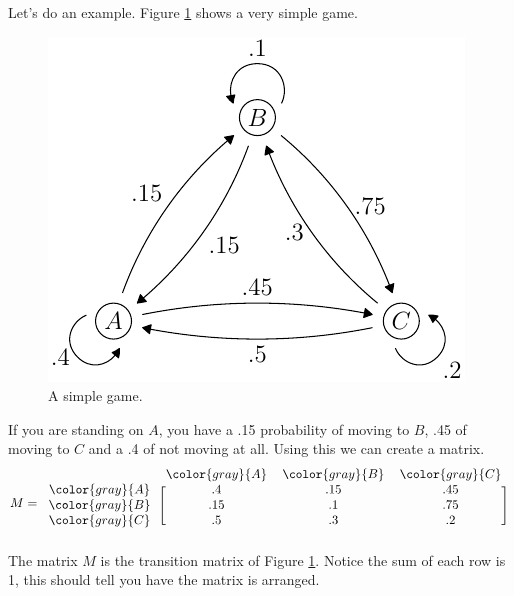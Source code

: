 \documentclass[11pt,letterpaper]{article}
\begin{document}
Let's do an example. Figure \ref{fig:simple_game} shows a very simple game. 
\begin{figure}[!h]
 \centering
 \includegraphics{images/simple_game.pdf}
 \caption{A simple game.}
 \label{fig:simple_game}
\end{figure}
If you are standing on $A$, you have a .15 probability of moving to $B$, .45 of moving to $C$ and a .4 of not moving at all. Using this we can create a matrix.
\begin{equation}
M  = 
\begin{blockarray}{cccc}
 & \color{gray}{A} & \color{gray}{B} & \color{gray}{C} \\
\begin{block}{c[ccc]}
  \color{gray}{A} & .4 & .15  & .45 \\
  \color{gray}{B} & .15 & .1  & .75 \\
  \color{gray}{C} & .5 & .3 & .2 \\
\end{block}
\end{blockarray}
\end{equation}
The matrix $M$ is the transition matrix of Figure \ref{fig:simple_game}. Notice the sum of each row is 1, this should tell you have the matrix is arranged. 
\end{document}
